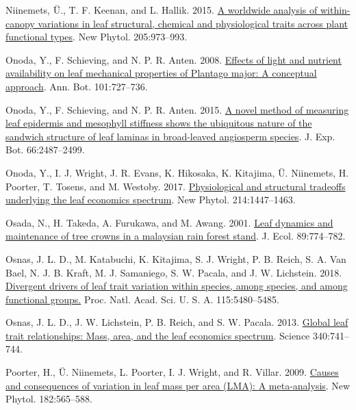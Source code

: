 \documentclass[
  12pt,
]{article}
\newlength{\cslhangindent}
\newlength{\cslentryspacingunit} %
\newenvironment{CSLReferences}[2] %
 {%
  \setlength{\parindent}{0pt}
  \ifodd #1
  \let\oldpar\par
  \def\par{\hangindent=\cslhangindent\oldpar}
  \fi
  \setlength{\parskip}{#2\cslentryspacingunit}
 }%
 {}
\begin{document}
\begin{CSLReferences}{1}{0}
\leavevmode{}%
Niinemets, Ü., T. F. Keenan, and L. Hallik. 2015. \href{https://doi.org/10.1111/nph.13096}{A worldwide analysis of within-canopy variations in leaf structural, chemical and physiological traits across plant functional types}. New Phytol. 205:973--993.

\leavevmode{}%
Onoda, Y., F. Schieving, and N. P. R. Anten. 2008. \href{https://doi.org/10.1093/aob/mcn013}{Effects of light and nutrient availability on leaf mechanical properties of {Plantago} major: {A} conceptual approach}. Ann. Bot. 101:727--736.

\leavevmode{}%
Onoda, Y., F. Schieving, and N. P. R. Anten. 2015. \href{https://doi.org/10.1093/jxb/erv024}{A novel method of measuring leaf epidermis and mesophyll stiffness shows the ubiquitous nature of the sandwich structure of leaf laminas in broad-leaved angiosperm species}. J. Exp. Bot. 66:2487--2499.

\leavevmode{}%
Onoda, Y., I. J. Wright, J. R. Evans, K. Hikosaka, K. Kitajima, Ü. Niinemets, H. Poorter, T. Tosens, and M. Westoby. 2017. \href{https://doi.org/10.1111/nph.14496}{Physiological and structural tradeoffs underlying the leaf economics spectrum}. New Phytol. 214:1447--1463.

\leavevmode{}%
Osada, N., H. Takeda, A. Furukawa, and M. Awang. 2001. \href{https://doi.org/10.1046/j.0022-0477.2001.00590.x}{Leaf dynamics and maintenance of tree crowns in a malaysian rain forest stand}. J. Ecol. 89:774--782.

\leavevmode{}%
Osnas, J. L. D., M. Katabuchi, K. Kitajima, S. J. Wright, P. B. Reich, S. A. Van Bael, N. J. B. Kraft, M. J. Samaniego, S. W. Pacala, and J. W. Lichstein. 2018. \href{https://doi.org/10.1073/pnas.1803989115}{Divergent drivers of leaf trait variation within species, among species, and among functional groups.} Proc. Natl. Acad. Sci. U. S. A. 115:5480--5485.

\leavevmode{}%
Osnas, J. L. D., J. W. Lichstein, P. B. Reich, and S. W. Pacala. 2013. \href{https://doi.org/10.1126/science.1231574}{Global leaf trait relationships: {Mass}, area, and the leaf economics spectrum}. Science 340:741--744.

\leavevmode{}%
Poorter, H., Ü. Niinemets, L. Poorter, I. J. Wright, and R. Villar. 2009. \href{https://doi.org/10.1111/j.1469-8137.2009.02830.x}{Causes and consequences of variation in leaf mass per area ({LMA}): {A} meta-analysis}. New Phytol. 182:565--588.


\end{CSLReferences}
\end{document}
